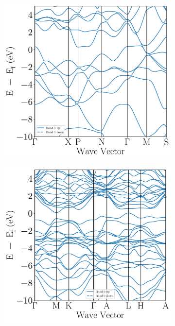 \documentclass[7.5pt]{article}
\theoremstyle{plain}
\theoremstyle{definition}
\newcommand{\<}{\langle}
\renewcommand{\>}{\rangle}
\begin{document}
\begin{figure}
\centering
\begin{subfigure}{.32\textwidth}
  \centering
  \includegraphics[width=\linewidth]{bs_MoSi2_tetragonal}
  \caption{}
\label{fig:bs-mosi2-tetra}
\end{subfigure}%
\begin{subfigure}{.32\textwidth}
  \centering
  \includegraphics[width=\linewidth]{bs_MoSi2_hexagonal}

\end{subfigure}
\end{figure}
\end{document}
